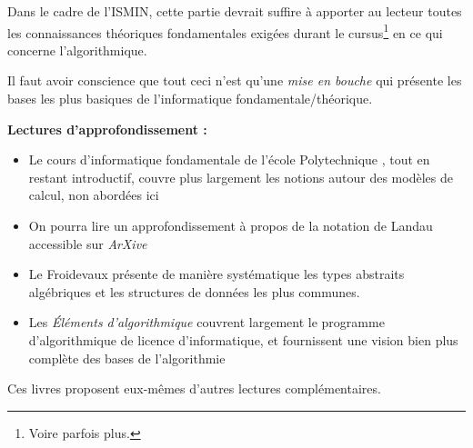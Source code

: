 \documentclass[../../main.tex]{subfiles}
\begin{document}
Dans le cadre de l'ISMIN, cette partie devrait suffire à apporter au lecteur toutes les connaissances théoriques fondamentales exigées durant le cursus\footnote{Voire parfois plus.} en ce qui concerne l'algorithmique.

Il faut avoir conscience que tout ceci n'est qu'une \textit{mise en bouche} qui présente les bases les plus basiques de l'informatique fondamentale/théorique.

\textbf{Lectures d'approfondissement :}
\begin{itemize}
	\item Le cours d'informatique fondamentale de l'école Polytechnique \cite{XFI}, tout en restant introductif, couvre plus largement les notions autour des modèles de calcul, non abordées ici
	\item On pourra lire un approfondissement à propos de la notation de Landau \cite{ONotation} accessible sur \textit{ArXive}
	\item Le Froidevaux \cite{Froidevaux} présente de manière systématique les types abstraits algébriques et les structures de données les plus communes.
	\item Les \textit{Éléments d'algorithmique} \cite{EltAlgorithmie} couvrent largement le programme d'algorithmique de licence d'informatique, et fournissent une vision bien plus complète des bases de l'algorithmie
\end{itemize}
Ces livres proposent eux-mêmes d'autres lectures complémentaires.
\end{document}

